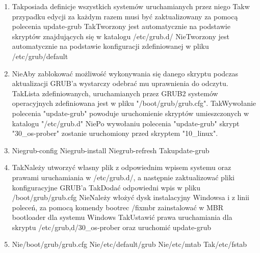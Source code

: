 \begin{enumerate}
	\item {}
	{Tak}{posiada definicje wszystkich systemów uruchamianych przez niego}
	{Tak}{w przypadku edycji za każdym razem musi być zaktualizowany za pomocą polecenia update-grub}
	{Tak}{Tworzony jest automatycznie na podstawie skryptów znajdujących się w katalogu /etc/grub.d/}
	{Nie}{Tworzony jest automatycznie na podstawie konfiguracji zdefiniowanej w pliku /etc/grub/default}
	
	\newpage

	\item {}
	{Nie}{Aby zablokować możliwość wykonywania się danego skryptu podczas aktualizacji GRUB'a wystarczy odebrać mu uprawnienia do odczytu.}
	{Tak}{Lista zdefiniowanych, uruchamianych przez GRUB2 systemów operacyjnych zdefiniowana jest w pliku "/boot/grub/grub.cfg".}
	{Tak}{Wywołanie polecenia "update-grub" powoduje uruchomienie skryptów umieszczonych w katalogu "/etc/grub.d"}
	{Nie}{Po wywołaniu polecenia "update-grub" skrypt "30\_os-prober" zostanie uruchomiony przed skryptem "10\_linux".}
	
	\item {}
	{Nie}{grub-config}
	{Nie}{grub-install}
	{Nie}{grub-refresh}
	{Tak}{update-grub}
	
	\item {}
	{Tak}{Należy utworzyć własny plik z odpowiednim wpisem systemu oraz prawami uruchamiania w /etc/grub.d/, a następnie zaktualizować pliki konfiguracyjne GRUB'a}
	{Tak}{Dodać odpowiedni wpis w pliku /boot/grub/grub.cfg}
	{Nie}{Należy włożyć dysk instalacyjny Windowsa i z linii poleceń, za pomocą komendy bootrec /fixmbr zainstalować w MBR bootloader dla systemu Windows}
	{Tak}{Ustawić prawa uruchamiania dla skryptu /etc/grub,d/30\_os-prober oraz uruchomić update-grub}

	\item {}
	{Nie}{/boot/grub/grub.cfg}
	{Nie}{/etc/default/grub}
	{Nie}{/etc/mtab}
	{Tak}{/etc/fstab}
	

\end{enumerate}
